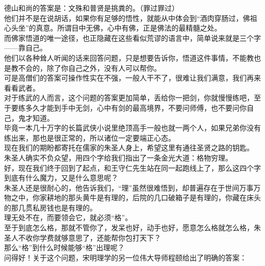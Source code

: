 \begin{multicols}{\theparacolNo}
德山和尚的答案是：文殊和普贤是挑粪的。（罪过罪过）\\

他们并不是在说胡话，如果你有足够的悟性，就能从中体会到“酒肉穿肠过，佛祖心头坐”的真意。所谓目中无佛，心中有佛，正是佛法的最精髓之处。\\

而佛家悟道的唯一途径，也正隐藏在这些看似荒谬的语言中，简单说来就是三个字——靠自己。\\

他们以各种耸人听闻的话来回答问题，只是想要告诉你，悟道这件事情，不能教也是教不会的，除了你自己之外，没有人可以帮你。\\

可是高僧们的答案可操作性实在不强，一般人干不了，很难让我们满意，我们再来看看武者。\\

对于练武的人而言，这个问题的答案更加简单，丢给你一把剑，你就慢慢练吧，至于要练多久才能到手中无剑，心中有剑的最高境界，不要问师傅，也不要问你自己，鬼才知道。\\

毕竟一本几十万字的长篇武侠小说里绝顶高手一般也就一两个人，如果兄弟你没有练出来，那也是很正常的，所以诸位一定要端正心态。\\

现在我们的期盼都寄托在儒家的朱圣人身上，希望这里有通往圣贤之路的钥匙。\\

朱圣人确实不负众望，用四个字给我们指出了一条金光大道：格物穷理。\\

好，现在我们终于回到了起点，和王守仁先生站在同一起跑线上了，那么这四个字到底有什么魔力，又是什么意思呢？\\

朱圣人还是很耐心的，他告诉我们，“理”虽然很难悟到，却普遍存在于世间万事万物之中，你家耕地的那头黄牛是有理的，后院的几口破箱子是有理的，你藏在床头的那几贯私房钱也是有理的。\\

理无处不在，而要领会它，就必须“格”。\\

至于到底怎么格，那就不管你了，发呆也好，动手也好，愿意怎么格就怎么格，朱圣人不收你学费就够意思了，还能帮你包打天下？\\

那么“格”到什么时候能够“格”出理呢？\\

问得好！关于这个问题，宋明理学的另一位伟大导师程颐给出了明确的答案：\\


\end{multicols}
